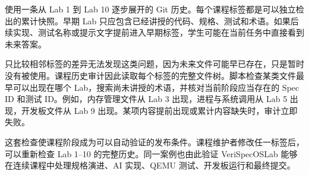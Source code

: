  使用一条从 Lab 1 到 Lab 10 逐步展开的 Git 历史。每个课程标签都是可以独立检出的累计快照。早期 Lab 只应包含已经讲授的代码、规格、测试和术语。如果后续实现、测试名称或提示文字提前进入早期标签，学生可能在当前任务中直接看到未来答案。

只比较相邻标签的差异无法发现这类问题，因为未来文件可能早已存在，只是暂时没有被使用。课程历史审计因此读取每个标签的完整文件树。脚本检查某类文件最早可以出现在哪个 Lab，搜索尚未讲授的术语，并核对当前阶段应当存在的 Spec ID 和测试 ID。例如，内存管理文件从 Lab 3 出现，进程与系统调用从 Lab 5 出现，开发板文件从 Lab 9 出现。某项内容提前出现或累计内容缺失时，审计立即失败。

这套检查使课程阶段成为可以自动验证的发布条件。课程维护者修改任一标签后，可以重新检查 Lab 1--10 的完整历史。同一案例也由此验证 VeriSpecOSLab 能够在连续课程中处理规格演进、AI 实现、QEMU 测试、开发板运行和最终提交。

